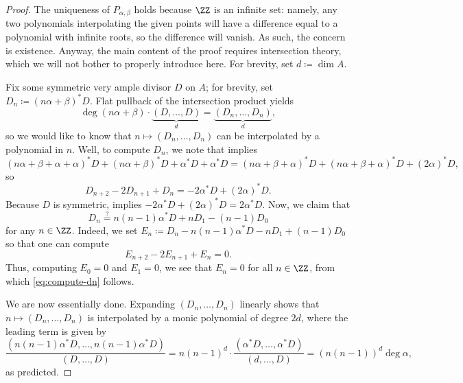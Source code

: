 \documentclass{amsart}
\begin{document}
\begin{proof}
	The uniqueness of $P_{\alpha,\beta}$ holds because $\ZZ$ is an infinite set: namely, any two polynomials interpolating the given points will have a difference equal to a polynomial with infinite roots, so the difference will vanish. As such, the concern is existence. Anyway, the main content of the proof requires intersection theory, which we will not bother to properly introduce here. For brevity, set $d\coloneqq\dim A$.
	
	Fix some symmetric very ample divisor $D$ on $A$; for brevity, set $D_n\coloneqq(n\alpha+\beta)^*D$. Flat pullback of the intersection product yields
	\[\deg(n\alpha+\beta)\cdot\underbrace{(D,\ldots,D)}_{d}=\underbrace{(D_n,\ldots,D_n)}_d,\]
	so we would like to know that $n\mapsto(D_n,\ldots,D_n)$ can be interpolated by a polynomial in $n$. Well, to compute $D_n$, we note that \cite[Corollary~2.13]{elber-av} implies
	\[(n\alpha+\beta+\alpha+\alpha)^*D+(n\alpha+\beta)^*D+\alpha^*D+\alpha^*D=(n\alpha+\beta+\alpha)^*D+(n\alpha+\beta+\alpha)^*D+(2\alpha)^*D,\]
	so
	\[D_{n+2}-2D_{n+1}+D_n=-2\alpha^*D+(2\alpha)^*D.\]
	Because $D$ is symmetric, \cite[Corollary~2.14]{elber-av} implies $-2\alpha^*D+(2\alpha)^*D=2\alpha^*D$. Now, we claim that
	\begin{equation}
		D_n\stackrel?=n(n-1)\alpha^*D+nD_1-(n-1)D_0 \label{eq:compute-dn}
	\end{equation}
	for any $n\in\ZZ$. Indeed, we set $E_n\coloneqq D_n-n(n-1)\alpha^*D-nD_1+(n-1)D_0$ so that one can compute
	\[E_{n+2}-2E_{n+1}+E_n=0.\]
	Thus, computing $E_0=0$ and $E_1=0$, we see that $E_n=0$ for all $n\in\ZZ$, from which \eqref{eq:compute-dn} follows.

	We are now essentially done. Expanding $(D_n,\ldots,D_n)$ linearly shows that $n\mapsto(D_n,\ldots,D_n)$ is interpolated by a monic polynomial of degree $2d$, where the leading term is given by
	\[\frac{(n(n-1)\alpha^*D,\ldots,n(n-1)\alpha^*D)}{(D,\ldots,D)}=n(n-1)^d\cdot\frac{(\alpha^*D,\ldots,\alpha^*D)}{(d,\ldots,D)}=(n(n-1))^d\deg\alpha,\]
	as predicted.
\end{proof}
\end{document}
